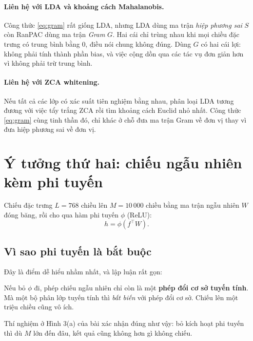 \documentclass[11pt,a4paper]{article}
\newenvironment{luuy}{\begin{leftbar}\noindent\ignorespaces}{\end{leftbar}}
\begin{document}
\paragraph{Liên hệ với LDA và khoảng cách Mahalanobis.}
Công thức \eqref{eq:gram} rất giống LDA, nhưng LDA dùng ma trận \emph{hiệp phương
sai} $S$ còn RanPAC dùng ma trận \emph{Gram} $G$. Hai cái chỉ trùng nhau khi mọi
chiều đặc trưng có trung bình bằng $0$, điều nói chung không đúng. Dùng $G$ có
hai cái lợi: không phải tính thành phần bias, và việc cộng dồn qua các tác vụ đơn
giản hơn vì không phải trừ trung bình.

\paragraph{Liên hệ với ZCA whitening.}
Nếu tất cả các lớp có xác suất tiên nghiệm bằng nhau, phân loại LDA tương đương
với việc tẩy trắng ZCA rồi tìm khoảng cách Euclid nhỏ nhất. Công thức
\eqref{eq:gram} cùng tinh thần đó, chỉ khác ở chỗ đưa ma trận Gram về đơn vị thay
vì đưa hiệp phương sai về đơn vị.

\section{Ý tưởng thứ hai: chiếu ngẫu nhiên kèm phi tuyến}
\label{sec:rp}

Chiếu đặc trưng $L = 768$ chiều lên $M = 10\,000$ chiều bằng ma trận ngẫu nhiên
$W$ đóng băng, rồi cho qua hàm phi tuyến $\phi$ (ReLU):
\begin{equation}
h = \phi(f^{\top} W).
\end{equation}

\subsection{Vì sao phi tuyến là bắt buộc}

Đây là điểm dễ hiểu nhầm nhất, và lập luận rất gọn:

\begin{luuy}
Nếu bỏ $\phi$ đi, phép chiếu ngẫu nhiên chỉ còn là một \textbf{phép đổi cơ sở
tuyến tính}. Mà một bộ phân lớp tuyến tính thì \emph{bất biến} với phép đổi cơ
sở. Chiếu lên một triệu chiều cũng vô ích.
\end{luuy}

Thí nghiệm ở Hình 3(a) của bài xác nhận đúng như vậy: bỏ kích hoạt phi tuyến thì
dù $M$ lớn đến đâu, kết quả cũng không hơn gì không chiếu.
\end{document}
